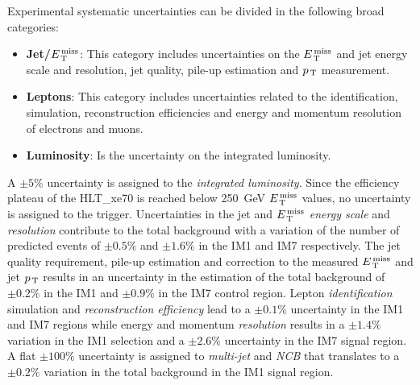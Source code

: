 Experimental systematic uncertainties can be divided in the following broad
categories:
\begin{itemize}
\item \textbf{Jet/$E_\mathrm{\, T}^\mathrm{\, miss}$}: This category includes uncertainties on the $E_\mathrm{\, T}^\mathrm{\, miss}$
  and jet energy scale and resolution, jet quality, pile-up estimation and
  $p_\mathrm{\, T}$ measurement.
\item \textbf{Leptons}: This category includes uncertainties related to the
  identification, simulation, reconstruction efficiencies and energy and
  momentum resolution of electrons and muons.
\item \textbf{Luminosity}: Is the uncertainty on the integrated luminosity.
\end{itemize}
A $\pm 5\%$ uncertainty is assigned to the \emph{integrated luminosity}. Since
the efficiency plateau of the HLT\_xe70 is reached below 250~GeV $E_\mathrm{\, T}^\mathrm{\, miss}$ values,
no uncertainty is assigned to the trigger. Uncertainties in the jet and $E_\mathrm{\, T}^\mathrm{\, miss}$
\emph{energy scale} and \emph{resolution} contribute to the total background
with a variation of the number of predicted events of $\pm 0.5\%$ and
$\pm 1.6\%$ in the IM1 and IM7 respectively. The jet quality requirement,
pile-up estimation and correction to the measured $E_\mathrm{\, T}^\mathrm{\, miss}$ and jet $p_\mathrm{\, T}$ results
in an uncertainty in the estimation of the total background of $\pm 0.2\%$ in
the IM1 and $\pm 0.9 \%$ in the IM7 control region. Lepton \emph{identification}
simulation and \emph{reconstruction efficiency} lead to a $\pm 0.1\%$
uncertainty in the IM1 and IM7 regions while energy and momentum
\emph{resolution} results in a $\pm 1.4\%$ variation in the IM1 selection and a
$\pm 2.6\%$ uncertainty in the IM7 signal region. A flat $\pm 100\%$ uncertainty
is assigned to \emph{multi-jet} and \emph{NCB} that translates to a $\pm 0.2\%$
variation in the total background in the IM1 signal region.
